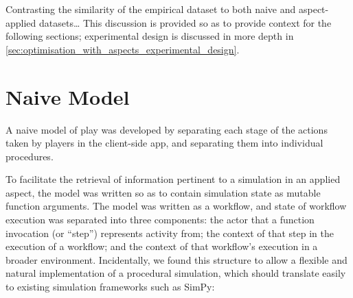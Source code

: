 
 Contrasting the similarity of the empirical dataset to both
naive and aspect-applied datasets\ldots{} This discussion is provided so as to
provide context for the following sections; experimental design is discussed in
more depth in \cref{sec:optimisation_with_aspects_experimental_design}. 


\section{Naive Model}\label{sec:optimisation_with_aspects_naivemodel}

A naive model of play was developed by separating each stage of the actions
taken by players in the client-side app, and separating them into individual
procedures. 

To facilitate the retrieval of information pertinent to a simulation in an
applied aspect, the model was written so as to contain simulation state as
mutable function arguments. The model was written as a workflow, and state of
workflow execution was separated into three components: the actor that a
function invocation (or ``step'') represents activity from; the context of that
step in the execution of a workflow; and the context of that workflow's
execution in a broader environment. Incidentally, we found this structure to
allow a flexible and natural implementation of a procedural simulation, which
should translate easily to existing simulation frameworks such as
SimPy\cite{simpy_intro}:

